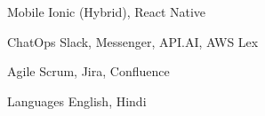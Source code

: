 \begin{cvskills}
\cvskill
{Mobile} %
{Ionic (Hybrid), React Native} %

\cvskill
{ChatOps} %
{Slack, Messenger, API.AI, AWS Lex} %

\cvskill
{Agile} %
{Scrum, Jira, Confluence} %


\cvskill
{Languages} %
{English, Hindi} %


\end{cvskills}
